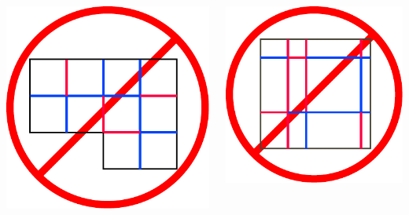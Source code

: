 \documentclass{beamer}
\begin{document}
\begin{frame}
\begin{columns}[c]
\includegraphics[width=\textwidth]{sam_images/no-map.pdf}

\bigskip

\includegraphics[width=\textwidth]{sam_images/no-map-2.pdf}

\end{columns}

\end{frame}
\end{document}
